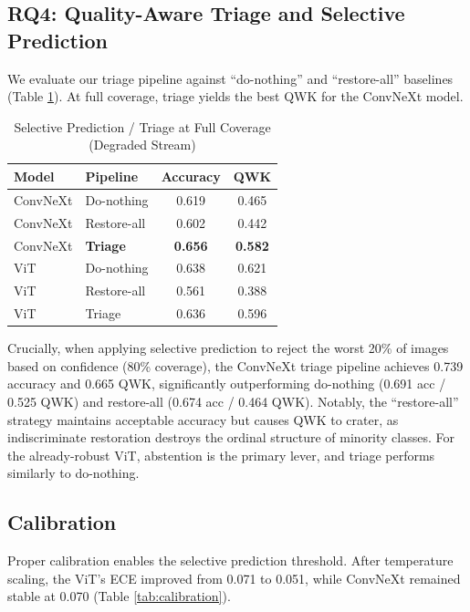 \documentclass[conference]{IEEEtran}
\begin{document}
\subsection{RQ4: Quality-Aware Triage and Selective Prediction}
We evaluate our triage pipeline against ``do-nothing'' and ``restore-all'' baselines (Table \ref{tab:triage}). At full coverage, triage yields the best QWK for the ConvNeXt model. 

\begin{table}[htbp]
\caption{Selective Prediction / Triage at Full Coverage (Degraded Stream)}
\begin{center}
\begin{tabular}{llcc}
\toprule
\textbf{Model} & \textbf{Pipeline} & \textbf{Accuracy} & \textbf{QWK} \\
\midrule
ConvNeXt & Do-nothing & 0.619 & 0.465 \\
ConvNeXt & Restore-all & 0.602 & 0.442 \\
ConvNeXt & \textbf{Triage} & \textbf{0.656} & \textbf{0.582} \\
\midrule
ViT & Do-nothing & 0.638 & 0.621 \\
ViT & Restore-all & 0.561 & 0.388 \\
ViT & Triage & 0.636 & 0.596 \\
\bottomrule
\end{tabular}
\label{tab:triage}
\end{center}
\end{table}

Crucially, when applying selective prediction to reject the worst 20\% of images based on confidence (80\% coverage), the ConvNeXt triage pipeline achieves 0.739 accuracy and 0.665 QWK, significantly outperforming do-nothing (0.691 acc / 0.525 QWK) and restore-all (0.674 acc / 0.464 QWK). Notably, the ``restore-all'' strategy maintains acceptable accuracy but causes QWK to crater, as indiscriminate restoration destroys the ordinal structure of minority classes. For the already-robust ViT, abstention is the primary lever, and triage performs similarly to do-nothing.

\subsection{Calibration}
Proper calibration enables the selective prediction threshold. After temperature scaling, the ViT's ECE improved from 0.071 to 0.051, while ConvNeXt remained stable at 0.070 (Table \ref{tab:calibration}).
\end{document}
